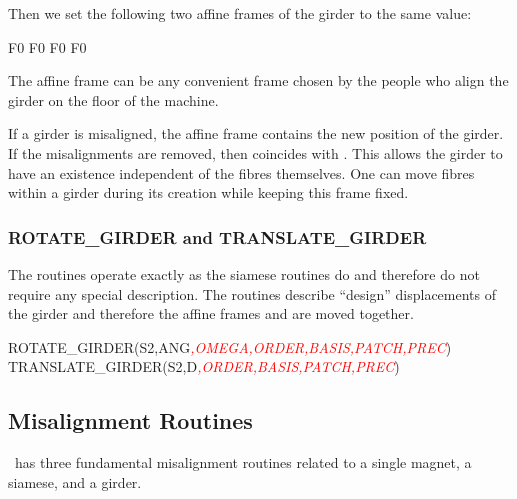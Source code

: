 Then we set the following two affine frames of the girder to the same
value:

\begin{ptccode}
F0%
F0%
F0%
F0%
\end{ptccode}

The affine frame  can be any convenient frame chosen by the
people who align the girder on the floor of the machine.

If a girder is misaligned, the affine frame  contains
the new position of the girder. If the misalignments are removed,
then  coincides with . This allows the girder to have
an existence independent of the fibres themselves. One can move fibres
within a girder during its creation while keeping this frame fixed.


\subsubsection*{ROTATE_GIRDER and TRANSLATE_GIRDER}

%
The routines operate exactly as the siamese routines do and therefore
do not require any special description. The routines describe ``design''
displacements of the girder and therefore the affine frames 
and  are moved together.

\begin{ptccode}
ROTATE_GIRDER(S2,ANG\textit{\textcolor{red}{,OMEGA,ORDER,BASIS,PATCH,PREC}})
TRANSLATE_GIRDER(S2,D\textit{\textcolor{red}{,ORDER,BASIS,PATCH,PREC}})
\end{ptccode}


\subsection{Misalignment Routines}

%
\PTC\ has three fundamental misalignment routines related to a single
magnet, a siamese, and a girder.

